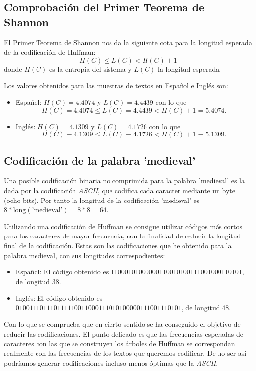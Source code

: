 \documentclass[10pt, spanish]{article}
\theoremstyle{definition}
\theoremstyle{break}
\renewcommand{\leq}{\leqslant}
\begin{document}
\subsection{Comprobación del Primer Teorema de Shannon}

El Primer Teorema de Shannon nos da la siguiente cota para la longitud esperada
de la codificación de Huffman: \[ H(C) \leq L(C) < H(C) + 1 \] donde $H(C)$
es la entropía del sistema y $L(C)$ la longitud esperada.

Los valores obtenidos para las muestras de textos en Español e Inglés son:

\begin{itemize}
    \item Español: $ H(C) = 4.4074$ y $ L(C) = 4.4439$ con lo que
        \[H(C) = 4.4074 \leq L(C) = 4.4439 < H(C) + 1 = 5.4074.\] 
    \item Inglés:  $H(C) = 4.1309$ y $L(C) = 4.1726$ con lo que
        \[H(C) = 4.1309 \leq L(C) = 4.1726 < H(C) + 1 = 5.1309.\]
\end{itemize} 

\subsection{Codificación de la palabra 'medieval'}

Una posible codificación binaria no comprimida para la palabra 'medieval' es la
dada por la codificación \textit{ASCII}, que codifica cada caracter mediante un
byte (ocho bits). Por tanto la longitud de la codificación 'medieval' es
$8*\text{long}(\text{'medieval'})=8*8=64$.

Utilizando una codificación de Huffman se consigue utilizar códigos más cortos
para los caracteres de mayor frecuencia, con la finalidad de reducir la longitud
final de la codificación. Estas son las codificaciones que he obtenido para la
palabra medieval, con sus longitudes correspodientes:
\begin{itemize}
    \item Español: El código obtenido es
        $11000101000000110010100111001000110101$, de longitud $38$.  
    \item Inglés: El código obtenido es
        $010011101110111110011000111010100000111001110101$, de longitud $48$.  
\end{itemize}

Con lo que se comprueba que en cierto sentido se ha conseguido el objetivo de
reducir las codificaciones. El punto delicado es que las frecuencias esperadas de
caracteres con las que se construyen los árboles de Huffman se correspondan
realmente con las frecuencias de los textos que queremos codificar. De no ser
así podríamos generar codificaciones incluso menos óptimas que la
\textit{ASCII}. 
\end{document}
